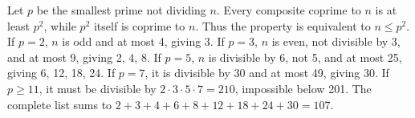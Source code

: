 Let $p$ be the smallest prime not dividing $n$. Every composite coprime to $n$ is at least $p^2$, while $p^2$ itself is coprime to $n$. Thus the property is equivalent to $n\le p^2$. If $p=2$, $n$ is odd and at most 4, giving 3. If $p=3$, $n$ is even, not divisible by 3, and at most 9, giving 2, 4, 8. If $p=5$, $n$ is divisible by 6, not 5, and at most 25, giving 6, 12, 18, 24. If $p=7$, it is divisible by 30 and at most 49, giving 30. If $p\ge11$, it must be divisible by $2\cdot3\cdot5\cdot7=210$, impossible below 201. The complete list sums to $2+3+4+6+8+12+18+24+30=\boxed{107}$.
